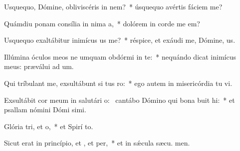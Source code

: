 \item Usquequo, Dómine, obliviscéris  in nem?~* úsquequo avértis fáciem   me?
\item Quámdiu ponam consília in nima a,~* dolórem in corde me  em?
\item Usquequo exaltábitur inimícus us  me?~* réspice, et exáudi me, Dómine,  us.
\item Illúmina óculos meos ne umquam obdórmi in te:~* nequándo dicat inimícus meus: præválui ad um.
\item Qui tríbulant me, exsultábunt si tus ro:~* ego autem in misericórdia tu vi.
\item Exsultábit cor meum in salutári o:~\pscross{} cantábo Dómino qui bona buit hi:~* et psallam nómini Dómi simi.
\item Glória tri, et o,~* et Spirí to.
\item Sicut erat in princípio, et , et per,~* et in sǽcula sæcu. men.
